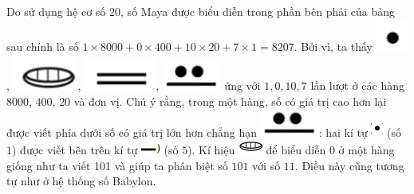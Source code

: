 	Do sử dụng hệ cơ số $20$,  số Maya được biểu diễn trong phần bên phải của bảng  sau chính là số  $1\times 8000+ 0\times 400+ 10\times20+ 7\times1= 8207$. Bởi vì, ta  thấy  \includegraphics[scale=0.5]{33},  \includegraphics[scale=0.5]{34},  \includegraphics[scale=0.5]{35}, \includegraphics[scale=0.5]{36}  ứng với $1, 0, 10, 7$  lần lượt ở các hàng $8000$, $400$, $20$ và đơn vị. Chú ý rằng, trong một hàng, số có giá trị cao hơn lại được viết phía dưới số có giá trị lớn hơn chẳng hạn  \includegraphics[scale=0.5]{36}:  hai kí tự \includegraphics{37} (số $1$) được viết bên trên kí tự \includegraphics{38} (số $5$). Kí hiệu \includegraphics{39} để biểu diễn $0$ ở một hàng giống như ta viết 101 và giúp ta phân biệt số $101$ với số $11$. Điều này cũng tương tự như ở hệ thống số Babylon. 
